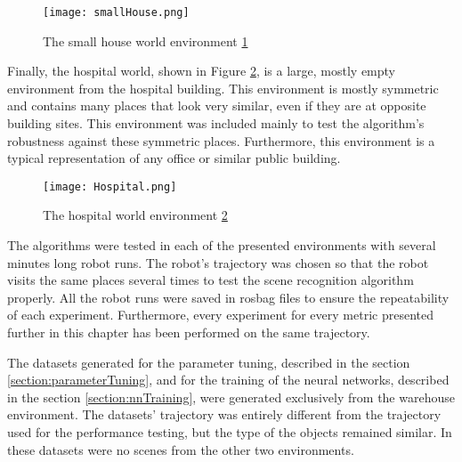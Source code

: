 \begin{figure}[htpb]
    \centering
    \texttt{[image: smallHouse.png]}
    \caption{The small house world environment \ref{fig:smallHouse}} \label{fig:smallHouse}
\end{figure}

Finally, the hospital world, shown in Figure \ref{fig:hospitalWorld}, is a large, mostly empty environment from the hospital building. This environment is mostly symmetric and contains many places that look very similar, even if they are at opposite building sites. This environment was included mainly to test the algorithm's robustness against these symmetric places. Furthermore, this environment is a typical representation of any office or similar public building.\par

\begin{figure}[htpb]
    \centering
    \texttt{[image: Hospital.png]}
    \caption{The hospital world environment \ref{fig:hospitalWorld}} \label{fig:hospitalWorld}
\end{figure}

The algorithms were tested in each of the presented environments with several minutes long robot runs. The robot's trajectory was chosen so that the robot visits the same places several times to test the scene recognition algorithm properly. All the robot runs were saved in rosbag files to ensure the repeatability of each experiment. Furthermore, every experiment for every metric presented further in this chapter has been performed on the same trajectory.\par
The datasets generated for the parameter tuning, described in the section \ref{section:parameterTuning}, and for the training of the neural networks, described in the section \ref{section:nnTraining}, were generated exclusively from the warehouse environment. The datasets' trajectory was entirely different from the trajectory used for the performance testing, but the type of the objects remained similar. In these datasets were no scenes from the other two environments.